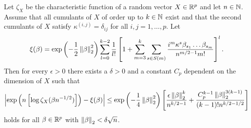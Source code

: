 \begin{theorem}
    Let $\zeta_X$ be the characteristic function of a random vector $X \in \mathbb{R}^p$ and let $n \in \mathbb{N}$. Assume that all cumulants of $X$ of order up to $k \in \mathbb{N}$ exist and that the second cumulants of $X$ satisfy $\kappa^{(i, j)} = \delta_{ij}$ for all $i, j = 1, \ldots, p$. Let
    \begin{equation*}
        \xi(\beta) = \exp\left(-\frac{1}{2}\left\lVert\beta\right\rVert_2^2\right)\sum_{l=0}^{k-2} \frac{1}{l!} \left[ 1 + \sum_{m=3}^k \sum_{s \in S(m)} \frac{i^m\kappa^s\beta_{s_1}\ldots\beta_{s_m}}{n^{m/2-1}m!} \right]^l.
    \end{equation*}
    Then for every $\epsilon > 0$ there exists a $\delta > 0$ and a constant $C_p$ dependent on the dimension of $X$ such that 
    \begin{equation}\label{eq-edge-bound}
        \left|\exp\left(n\left[\log \zeta_X(\beta n^{-1/2})\right]\right) - \xi(\beta)\right| \leq \exp\left(-\frac{1}{4}\left\lVert\beta\right\rVert_2^2\right)\left[ \frac{\epsilon\left\lVert\beta\right\rVert_2^k}{n^{k/2-1}} + \frac{C_p^{k-1}\left\lVert\beta\right\rVert_2^{3(k-1)}}{(k-1)!n^{k/2-1/2}} \right]
    \end{equation}
    holds for all $\beta \in \mathbb{R}^p$ with $\left\lVert\beta\right\rVert_2 < \delta\sqrt{n}$.
\end{theorem}

